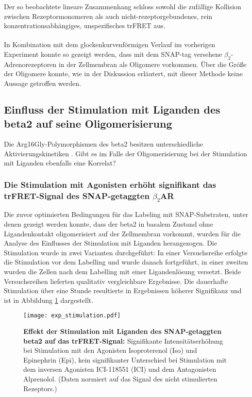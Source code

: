 Der so beobachtete lineare Zusammenhang schloss sowohl die zufällige Kollision zwischen Rezeptormonomeren als auch nicht-rezeptorgebundenes, rein konzentrationsabhängiges, unspezifisches trFRET aus.
\\ \\
In Kombination mit dem glockenkurvenförmigen Verlauf im vorherigen Experiment konnte so gezeigt werden, dass mit dem SNAP-tag versehene $\beta_2$-Adrenorezeptoren in der Zellmembran als Oligomere vorkommen. Über die Größe der Oligomere konnte, wie in der Diskussion erläutert, mit dieser Methode keine Aussage getroffen werden. 

\subsection{Einfluss der Stimulation mit Liganden des \gls{beta2} auf seine Oligomerisierung}
Die Arg16Gly-Polymorphismen des \gls{beta2} besitzen unterschiedliche Aktivierungskinetiken \parencite{Ahles2011}. Gibt es im Falle der Oligomerisierung bei der Stimulation mit Liganden ebenfalls eine Korrelat? 
 
\subsubsection{Die Stimulation mit Agonisten erhöht signifikant das trFRET-Signal des SNAP-getaggten $\beta_2$AR}

Die zuvor optimierten Bedingungen für das Labeling mit SNAP-Substraten, unter denen gezeigt werden konnte, dass der \gls{beta2} in basalem Zustand ohne Ligandenkontakt oligomerisiert auf der Zellmembran vorkommt, wurden für die Analyse des Einflusses der Stimulation mit Liganden herangezogen. Die Stimulation wurde in zwei Varianten durchgeführt: In einer Versuchsreihe erfolgte die Stimulation vor dem Labelling und wurde danach fortgeführt, in einer zweiten wurden die Zellen nach dem Labelling mit einer Ligandenlösung versetzt. Beide Versuchsreihen lieferten qualitativ vergleichbare Ergebnisse. Die dauerhafte Stimulation über eine Stunde resultierte in Ergebnissen höherer Signifikanz und ist in Abbildung \ref{fig:stimulation} dargestellt.

\begin{figure}[htbp]
	\centering
    \texttt{[image: exp\_stimulation.pdf]}
    \caption{\textbf{Effekt der Stimulation mit Liganden des SNAP-getaggten \gls{beta2} auf das trFRET-Signal:} Signifikante Intensitätserhöhung bei Stimulation mit den Agonisten Isoproterenol (Iso) und Epinephrin (Epi), kein signifikanter Unterschied bei Stimulation mit dem inversen Agonisten ICI-118551 (ICI) und dem Antagonisten Alprenolol. (Daten normiert auf das Signal des nicht stimulierten Rezeptors.)} 
    \label{fig:stimulation}
\end{figure}

